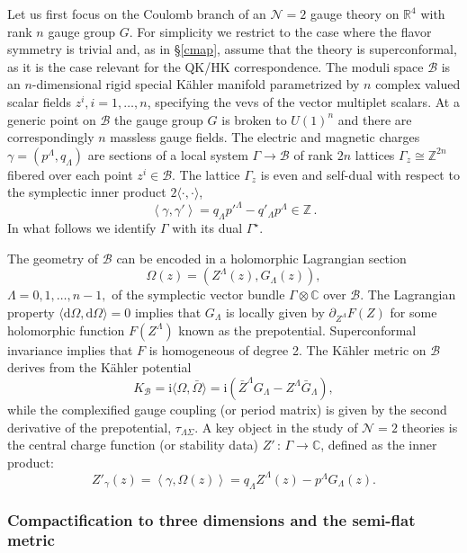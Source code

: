 \documentclass[12pt,reqno]{article}
\numberwithin{equation}{section}
\newcommand{\be}{\begin{equation}}
\newcommand{\ee}{\end{equation}}
\newcommand{\de}{\mathrm{d}}
\newcommand{\I}{\mathrm{i}}
\newcommand{\cB}{\mathcal{B}}
\newcommand{\cN}{\mathcal{N}}
\newcommand{\IC}{\mathbb{C}}
\newcommand{\IZ}{\mathbb{Z}}
\newcommand{\kahler}{{K\"ahler}\xspace}
\def\rigZ{Z}
\numberwithin{equation}{section}
\begin{document}
Let us first focus on the Coulomb branch of an $\cN=2$ gauge theory
on $\mathbb{R}^4$ with rank $n$ gauge group $G$. For simplicity
we restrict to the case where the flavor symmetry is trivial and, as in \S\ref{cmap},
assume that the theory is superconformal, as it is the case relevant for the
QK/HK correspondence. The
moduli space $\cB$ is an $n$-dimensional rigid special K\"ahler manifold
parametrized
by $n$ complex valued scalar fields
$z^{i}, i=1, \dots, n$, specifying the vevs of the vector multiplet scalars.
At a generic point on $\cB$ the gauge group $G$ is broken to $U(1)^n$
and there are correspondingly $n$ massless gauge fields. The electric
and magnetic charges $\gamma=(p^{\Lambda}, q_\Lambda)$ are
sections of a local system $\Gamma\rightarrow \cB$ of rank $2n$
lattices $\Gamma_z\cong \IZ^{2n}$ fibered over each point $z^i\in\cB$.
The lattice $\Gamma_z$ is even and self-dual  with respect to the
symplectic inner product $2\langle\cdot,\cdot\rangle$,
\be
\left<\gamma, \gamma'\right>= q_\Lambda p'^{\Lambda}-q'_\Lambda p^{\Lambda} \in\IZ\, .
\label{SymplecticPairing}
\ee
In what follows we identify $\Gamma$
with its dual $\Gamma^{\star}$.

The geometry of $\cB$ can be encoded in a holomorphic  Lagrangian
section
\be
\Omega(z)=(Z^{\Lambda}(z), G_\Lambda(z)),
\ee
$\Lambda=0, 1, \dots, n-1,$ of the
symplectic vector bundle $\Gamma\otimes\IC$ over $\cB$. The Lagrangian
property $\langle \de\Omega,\de\Omega \rangle=0$ implies that $G_\Lambda$
 is locally given by  $\partial_{Z^{\Lambda}}F(Z)$ for some holomorphic
 function $F(Z^\Lambda)$ known as the prepotential. Superconformal
 invariance implies that $F$ is homogeneous of degree 2.
 The \kahler metric on $\cB$ derives from
 the K\"ahler potential
\be
K_\cB= \I \langle \Omega, \bar\Omega \rangle
=\I(\bar{\rigZ}^{\Lambda}G_\Lambda-\rigZ^{\Lambda}\bar{G}_\Lambda) ,
\label{KahlerpotB}
\ee
while the complexified gauge coupling (or period matrix)
is given by the second derivative of the prepotential,
$\tau_{\Lambda\Sigma}$.
A key object in the study of $\cN=2$ theories is the central charge function (or stability data)
$Z' \, :\, \Gamma \to \mathbb{C}$, defined as the inner product:
\be
Z'_\gamma(z) = \left< \gamma, \Omega(z)\right> = q_\Lambda \rigZ^\Lambda(z)
- p^\Lambda G_\Lambda(z) .
\label{centralcharge}
\ee



\subsubsection{Compactification to three dimensions and the semi-flat metric}
\end{document}
